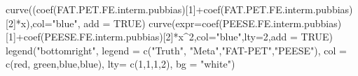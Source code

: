 \documentclass[
]{book}
\newenvironment{Shaded}{\begin{snugshade}}{\end{snugshade}}
\newcommand{\AttributeTok}[1]{\textcolor[rgb]{0.77,0.63,0.00}{#1}}
\newcommand{\ConstantTok}[1]{\textcolor[rgb]{0.00,0.00,0.00}{#1}}
\newcommand{\DecValTok}[1]{\textcolor[rgb]{0.00,0.00,0.81}{#1}}
\newcommand{\FunctionTok}[1]{\textcolor[rgb]{0.00,0.00,0.00}{#1}}
\newcommand{\NormalTok}[1]{#1}
\newcommand{\SpecialCharTok}[1]{\textcolor[rgb]{0.00,0.00,0.00}{#1}}
\newcommand{\StringTok}[1]{\textcolor[rgb]{0.31,0.60,0.02}{#1}}
\theoremstyle{definition}
\theoremstyle{definition}
\theoremstyle{definition}
\theoremstyle{definition}
\theoremstyle{remark}
\begin{document}
\begin{Shaded}
\begin{Highlighting}[]
\FunctionTok{curve}\NormalTok{((}\FunctionTok{coef}\NormalTok{(FAT.PET.FE.interm.pubbias)[}\DecValTok{1}\NormalTok{]}\SpecialCharTok{+}\FunctionTok{coef}\NormalTok{(FAT.PET.FE.interm.pubbias)[}\DecValTok{2}\NormalTok{]}\SpecialCharTok{*}\NormalTok{x),}\AttributeTok{col=}\StringTok{"blue"}\NormalTok{, }\AttributeTok{add =} \ConstantTok{TRUE}\NormalTok{)}
\FunctionTok{curve}\NormalTok{(}\AttributeTok{expr=}\FunctionTok{coef}\NormalTok{(PEESE.FE.interm.pubbias)[}\DecValTok{1}\NormalTok{]}\SpecialCharTok{+}\FunctionTok{coef}\NormalTok{(PEESE.FE.interm.pubbias)[}\DecValTok{2}\NormalTok{]}\SpecialCharTok{*}\NormalTok{x}\SpecialCharTok{\^{}}\DecValTok{2}\NormalTok{,}\AttributeTok{col=}\StringTok{"blue"}\NormalTok{,}\AttributeTok{lty=}\DecValTok{2}\NormalTok{,}\AttributeTok{add =} \ConstantTok{TRUE}\NormalTok{)}
\FunctionTok{legend}\NormalTok{(}\StringTok{"bottomright"}\NormalTok{,}
       \AttributeTok{legend =} \FunctionTok{c}\NormalTok{(}\StringTok{"Truth"}\NormalTok{, }\StringTok{"Meta"}\NormalTok{,}\StringTok{"FAT{-}PET"}\NormalTok{,}\StringTok{"PEESE"}\NormalTok{),}
       \AttributeTok{col =} \FunctionTok{c}\NormalTok{(}\StringTok{\textquotesingle{}red\textquotesingle{}}\NormalTok{, }\StringTok{\textquotesingle{}green\textquotesingle{}}\NormalTok{,}\StringTok{\textquotesingle{}blue\textquotesingle{}}\NormalTok{,}\StringTok{\textquotesingle{}blue\textquotesingle{}}\NormalTok{),}
       \AttributeTok{lty=} \FunctionTok{c}\NormalTok{(}\DecValTok{1}\NormalTok{,}\DecValTok{1}\NormalTok{,}\DecValTok{1}\NormalTok{,}\DecValTok{2}\NormalTok{),}
       \AttributeTok{bg =} \StringTok{"white"}\NormalTok{)}


\end{Highlighting}
\end{Shaded}
\end{document}
